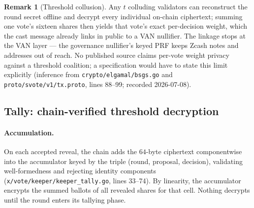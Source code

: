 \documentclass[11pt,a4paper]{article}
\theoremstyle{definition}
\newtheorem{remark}[theorem]{Remark}
\begin{document}
\begin{remark}[Threshold collusion]\label{rem:vote-ea-collusion}
Any $t$ colluding validators can reconstruct the round secret offline and
decrypt every individual on-chain ciphertext; summing one vote's sixteen
shares then yields that vote's exact per-decision weight, which the cast
message already links in public to a VAN nullifier. The linkage stops at the
VAN layer --- the governance nullifier's keyed PRF keeps Zcash notes and
addresses out of reach. No published source claims per-vote weight privacy
against a threshold coalition; a specification would have to state this
limit explicitly (inference from \texttt{crypto/elgamal/bsgs.go} and
\texttt{proto/svote/v1/tx.proto}, lines 88--99; recorded 2026-07-08).
\end{remark}

\subsection{Tally: chain-verified threshold decryption}
\label{sec:vote-decrypt}

\paragraph{Accumulation.} On each accepted reveal, the chain adds the
$64$-byte ciphertext componentwise into the accumulator keyed by the triple
(round, proposal, decision), validating well-formedness and rejecting
identity components (\texttt{x/vote/keeper/keeper\_tally.go}, lines 33--74).
By linearity, the accumulator encrypts the summed ballots of all revealed
shares for that cell. Nothing decrypts until the round enters its tallying
phase.
\end{document}
